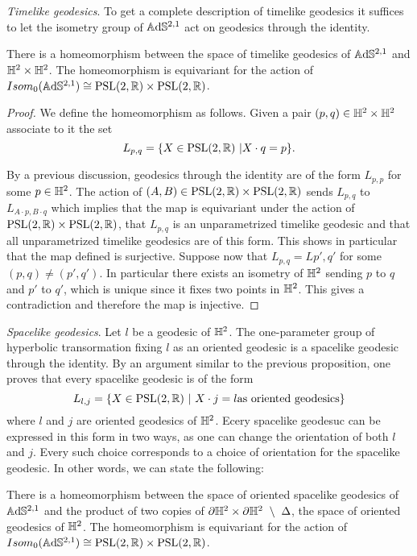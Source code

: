 \noindent\textit{Timelike geodesics}.
To get a complete description of timelike geodesics it suffices to let the isometry group of $\mathbb{A}\mathrm{d}\mathbb{S}^{2,1}$ act on geodesics through the identity.
\begin{proposition}
    There is a homeomorphism between the space of timelike geodesics of $\mathbb{A}\mathrm{d}\mathbb{S}^{2,1}$ and $\mathbb{H}^2 \times \mathbb{H}^2$.
    The homeomorphism is equivariant for the action of $Isom_0(\mathbb{A}\mathrm{d}\mathbb{S}^{2,1}) \cong \text{PSL}(2,\mathbb{R}) \times \text{PSL}(2,\mathbb{R})$.
\end{proposition}
\begin{proof}
    We define the homeomorphism as follows. Given a pair $(p,q) \in \mathbb{H}^2\times\mathbb{H}^2$ associate to it the set
    \[
        L_{p,q} = \{X \in \text{PSL}(2,\mathbb{R}) \ | X \cdot q = p\}.
    \]
    
    By a previous discussion, geodesics through the identity are of the form $L_{p,p}$ for some $p\in\mathbb{H}^2$. The action of $(A,B) \in \text{PSL}(2,\mathbb{R}) \times \text{PSL}(2,\mathbb{R})$ sends $L_{p,q}$ to $L_{A\cdot p, B\cdot q}$ which implies that the map is equivariant under the action of $\text{PSL}(2,\mathbb{R})\times\text{PSL}(2,\mathbb{R})$, that $L_{p,q}$ is an unparametrized timelike geodesic and that all unparametrized timelike geodesics are of this form. This shows in particular that the map defined is surjective.
    Suppose now that $L_{p,q} = L{p',q'}$ for some $(p,q) \neq (p',q')$. In particular there exists an isometry of $\mathbb{H}^2$ sending $p$ to $q$ and $p'$ to $q'$, which is unique since it fixes two points in $\mathbb{H}^2$. This gives a contradiction and therefore the map is injective.
\end{proof}

\noindent\textit{Spacelike geodesics}.
Let $l$ be a geodesic of $\mathbb{H}^2$. The one-parameter group of hyperbolic transormation fixing $l$ as an oriented geodesic is a spacelike geodesic through the identity. By an argument similar to the previous proposition, one proves that every spacelike geodesic is of the form
\[
    L_{l,j} = \{ X \in\text{PSL}(2,\mathbb{R}) \ | \ X \cdot j = l \text{as oriented geodesics} \}
\]
where $l$ and $j$ are oriented geodesics of $\mathbb{H}^2$. Ecery spacelike geodesuc can be expressed in this form in two ways, as one can change the orientation of both $l$ and $j$. Every such choice corresponds to a choice of orientation for the spacelike geodesic. In other words, we can state the following:
\begin{proposition}
    There is a homeomorphism between the space of oriented spacelike geodesics of $\mathbb{A}\mathrm{d}\mathbb{S}^{2,1}$ and the product of two copies of $\partial \mathbb{H}^2 \times \partial \mathbb{H}^2 \ \setminus \ \Delta$, the space of oriented geodesics of $\mathbb{H}^2$. 
    The homeomorphism is equivariant for the action of $Isom_0(\mathbb{A}\mathrm{d}\mathbb{S}^{2,1}) \cong \text{PSL}(2,\mathbb{R}) \times \text{PSL}(2,\mathbb{R})$.
\end{proposition}